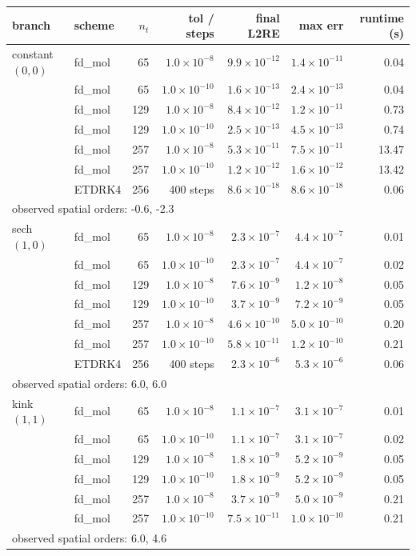 \begin{tabular}{llrrrrr}
\toprule
branch & scheme & $n_t$ & tol / steps & final L2RE & max err & runtime (s) \\
\midrule
constant $(0,0)$ & fd\_mol & 65 & $1.0\times10^{-8}$ & $9.9\times10^{-12}$ & $1.4\times10^{-11}$ & 0.04 \\
 & fd\_mol & 65 & $1.0\times10^{-10}$ & $1.6\times10^{-13}$ & $2.4\times10^{-13}$ & 0.04 \\
 & fd\_mol & 129 & $1.0\times10^{-8}$ & $8.4\times10^{-12}$ & $1.2\times10^{-11}$ & 0.73 \\
 & fd\_mol & 129 & $1.0\times10^{-10}$ & $2.5\times10^{-13}$ & $4.5\times10^{-13}$ & 0.74 \\
 & fd\_mol & 257 & $1.0\times10^{-8}$ & $5.3\times10^{-11}$ & $7.5\times10^{-11}$ & 13.47 \\
 & fd\_mol & 257 & $1.0\times10^{-10}$ & $1.2\times10^{-12}$ & $1.6\times10^{-12}$ & 13.42 \\
 & ETDRK4 & 256 & 400 steps & $8.6\times10^{-18}$ & $8.6\times10^{-18}$ & 0.06 \\
\multicolumn{7}{l}{\quad\footnotesize observed spatial orders: -0.6, -2.3} \\[2pt]
sech $(1,0)$ & fd\_mol & 65 & $1.0\times10^{-8}$ & $2.3\times10^{-7}$ & $4.4\times10^{-7}$ & 0.01 \\
 & fd\_mol & 65 & $1.0\times10^{-10}$ & $2.3\times10^{-7}$ & $4.4\times10^{-7}$ & 0.02 \\
 & fd\_mol & 129 & $1.0\times10^{-8}$ & $7.6\times10^{-9}$ & $1.2\times10^{-8}$ & 0.05 \\
 & fd\_mol & 129 & $1.0\times10^{-10}$ & $3.7\times10^{-9}$ & $7.2\times10^{-9}$ & 0.05 \\
 & fd\_mol & 257 & $1.0\times10^{-8}$ & $4.6\times10^{-10}$ & $5.0\times10^{-10}$ & 0.20 \\
 & fd\_mol & 257 & $1.0\times10^{-10}$ & $5.8\times10^{-11}$ & $1.2\times10^{-10}$ & 0.21 \\
 & ETDRK4 & 256 & 400 steps & $2.3\times10^{-6}$ & $5.3\times10^{-6}$ & 0.06 \\
\multicolumn{7}{l}{\quad\footnotesize observed spatial orders: 6.0, 6.0} \\[2pt]
kink $(1,1)$ & fd\_mol & 65 & $1.0\times10^{-8}$ & $1.1\times10^{-7}$ & $3.1\times10^{-7}$ & 0.01 \\
 & fd\_mol & 65 & $1.0\times10^{-10}$ & $1.1\times10^{-7}$ & $3.1\times10^{-7}$ & 0.02 \\
 & fd\_mol & 129 & $1.0\times10^{-8}$ & $1.8\times10^{-9}$ & $5.2\times10^{-9}$ & 0.05 \\
 & fd\_mol & 129 & $1.0\times10^{-10}$ & $1.8\times10^{-9}$ & $5.2\times10^{-9}$ & 0.05 \\
 & fd\_mol & 257 & $1.0\times10^{-8}$ & $3.7\times10^{-9}$ & $5.0\times10^{-9}$ & 0.21 \\
 & fd\_mol & 257 & $1.0\times10^{-10}$ & $7.5\times10^{-11}$ & $1.0\times10^{-10}$ & 0.21 \\
\multicolumn{7}{l}{\quad\footnotesize observed spatial orders: 6.0, 4.6} \\[2pt]
\bottomrule
\end{tabular}